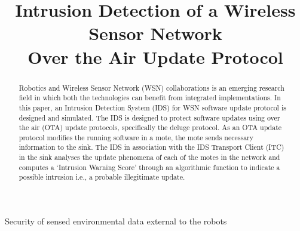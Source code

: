 \documentclass[conference,final]{IEEEtran}
\begin{document}
\title{Intrusion Detection of a Wireless Sensor Network\\Over the Air Update Protocol}
\author{
}



\maketitle


\begin{abstract}
Robotics and  Wireless Sensor Network (WSN) collaborations is an emerging research field in which both the technologies can benefit from integrated implementations.
In this paper, an Intrusion Detection System (IDS) for WSN  software update protocol is designed and simulated. 
The IDS is designed to protect software updates using over the air (OTA) update protocols, specifically the deluge protocol.
As an OTA update protocol modifies the running software in a mote, the mote sends necessary information to the sink. 
The IDS in association with the IDS Transport Client (ITC) in the sink analyses the update phenomena of each of the
motes in the network and computes a `Intrusion Warning Score' through an algorithmic function to indicate a possible intrusion i.e., a probable illegitimate update.
\end{abstract}


%
\IEEEpeerreviewmaketitle %
Security of sensed environmental data external to the robots
\end{document}
